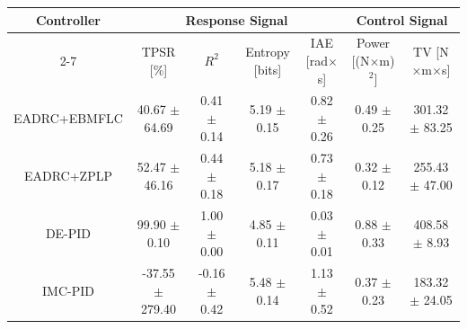 \begin{tabular}{
    c | c | c | c | c | c | c 
}
    \multirow{2}{*}{Controller} &
    \multicolumn{4}{c}{Response Signal} &
    \multicolumn{2}{|c}{Control Signal} \\
    \cline{2-7}
    &
    TPSR [\%] & 
    $R^2$ & 
    Entropy [bits] & 
    IAE [rad$\times$s] & 
    Power [(N$\times$m)$^2$] & 
    TV [N$\times$m$\times$s] 
\\
    \hline
EADRC+EBMFLC & 40.67 $\pm$ 64.69 & 0.41 $\pm$ 0.14 & 5.19 $\pm$ 0.15 & 0.82 $\pm$ 0.26 & 0.49 $\pm$ 0.25 & 301.32 $\pm$ 83.25 \\
EADRC+ZPLP & 52.47 $\pm$ 46.16 & 0.44 $\pm$ 0.18 & 5.18 $\pm$ 0.17 & 0.73 $\pm$ 0.18 & 0.32 $\pm$ 0.12 & 255.43 $\pm$ 47.00 \\
DE-PID & 99.90 $\pm$ 0.10 & 1.00 $\pm$ 0.00 & 4.85 $\pm$ 0.11 & 0.03 $\pm$ 0.01 & 0.88 $\pm$ 0.33 & 408.58 $\pm$ 8.93 \\
IMC-PID & -37.55 $\pm$ 279.40 & -0.16 $\pm$ 0.42 & 5.48 $\pm$ 0.14 & 1.13 $\pm$ 0.52 & 0.37 $\pm$ 0.23 & 183.32 $\pm$ 24.05 \\
\end{tabular}
